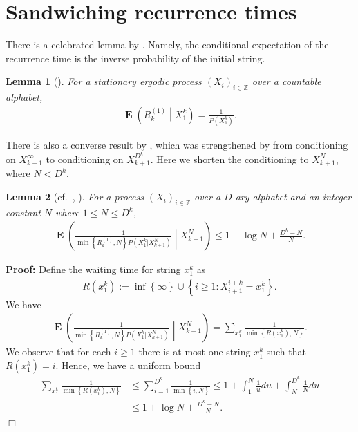 \documentclass[a4paper,12pt]{article}
\newcommand{\okra}[1]{\left( #1 \right)}
\newcommand{\klam}[1]{\left\{ #1 \right\}}
\DeclareMathOperator{\mean}{\mathbf{E}}
\newtheorem{lemma}{Lemma}
\newenvironment*{proof}{\begin{trivlist}\item[]
\noindent\textbf{Proof:}}{$\Box$\par\end{trivlist}}
\begin{document}


\section{Sandwiching recurrence times}
\label{secRecurrence}

There is a celebrated lemma by \citeauthor{Kac47}. Namely, the
conditional expectation of the recurrence time is the inverse
probability of the initial string.
\begin{lemma}[\citep{Kac47}]
  \label{theoKac}
  For a stationary ergodic process $(X_i)_{i\in\mathbb{Z}}$ over a
  countable alphabet,
  \begin{align}
    \mean\okra{R^{(1)}_k\middle|X_1^k}
    =
    \frac{1}{P(X_1^k)}.
  \end{align}
\end{lemma}
There is also a converse result by \citet{Kontoyiannis98}, which was
strengthened by \citet{Debowski18b} from conditioning on
$X_{k+1}^\infty$ to conditioning on $X_{k+1}^{D^k}$. Here we shorten
the conditioning to $X_{k+1}^{N}$, where $N<D^k$.
\begin{lemma}[cf.\ \citep{Kontoyiannis98}, \mbox{\citep[Lemma 2]{Debowski18b}}]
  \label{theoKontoyiannis}
  For a process $(X_i)_{i\in\mathbb{Z}}$ over a $D$-ary alphabet and
  an integer constant $N$ where $1\le N\le D^k$,
  \begin{align}
    \mean\okra{\frac{1}{\min\klam{R^{(1)}_k,N}
    P(X_1^k|X_{k+1}^N)}\middle|X_{k+1}^N}
    \le
    1+\log N+\frac{D^k-N}{N}.
  \end{align}
\end{lemma}
\begin{proof}
  Define the waiting time for string $x_1^k$ as
  \begin{align}
   R(x_1^k):=\inf\klam{\infty}\cup\klam{i\ge 1: X_{i+1}^{i+k}=x_1^k}. 
  \end{align}
  We have
  \begin{align}
    \mean\okra{\frac{1}{\min\klam{R^{(1)}_k,N}
    P(X_1^k|X_{k+1}^N)}\middle|X_{k+1}^N}
    =
    \sum_{x_1^k}\frac{1}{\min\klam{R(x_1^k),N}}.
  \end{align}
  We observe that for each $i\ge 1$ there is at most one string
  $x_1^k$ such that $R(x_1^k)=i$. Hence, we have a uniform bound
\begin{align}
  \sum_{x_1^k}\frac{1}{\min\klam{R(x_1^k),N}}
  &\le
  \sum_{i=1}^{D^k}\frac{1}{\min\klam{i,N}}
  \le
    1+\int_{1}^{N}\frac{1}{u}du+\int_{N}^{D^k}\frac{1}{N}du
    \nonumber\\
  &\le
  1+\log N+\frac{D^k-N}{N}.
\end{align}
\end{proof}
\end{document}
